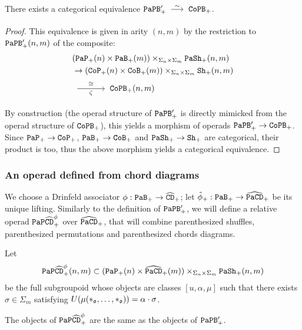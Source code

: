 \begin{proposition} \label{sw.prop.papb-prime}
  There exists a categorical equivalence $\PaPB_{+}' \qiso \CoPB_{+}$.
\end{proposition}
\begin{proof}
  This equivalence is given in arity $(n,m)$ by the restriction to $\mathtt{PaPB}'_{+}(n,m)$ of the composite:
  \begin{align*}
    & (\PaP_{+}(n) \times \PaB_{+}(m)) \times_{\Sigma_{n} \times
    \Sigma_{m}} \PaSh_{+}(n,m)
    \\
    & \to (\CoP_{+}(n) \times \CoB_{+}(m)) \times_{\Sigma_{n} \times \Sigma_{m}} \Sh_{+}(n,m)
    \\
    & \tkrightarrow[\zeta]{\cong} \CoPB_{+}(n,m)
  \end{align*}

  By construction (the operad structure of $\mathtt{PaPB}'_{+}$ is directly mimicked from the operad structure of $\mathtt{CoPB}_{+}$), this yields a morphism of operads $\mathtt{PaPB}'_{+} \to \mathtt{CoPB}_{+}$.
  Since $\mathtt{PaP}_{+} \to \mathtt{CoP}_{+}$, $\mathtt{PaB}_{+} \to \mathtt{CoB}_{+}$ and $\mathtt{PaSh}_{+} \to \mathtt{Sh}_{+}$ are categorical, their product is too, thus the above morphism yields a categorical equivalence.
\end{proof}

\subsubsection{An operad defined from chord diagrams}
\label{sw.sec.an-operad-defined}

We choose a Drinfeld associator $\phi : \mathtt{PaB}_{+} \to \widehat{\mathtt{CD}}_{+}$; let $\tilde\phi_{+} : \mathtt{PaB}_{+} \to \widehat{\mathtt{PaCD}}_{+}$ be its unique lifting.
Similarly to the definition of $\mathtt{PaPB}'_{+}$, we will define a relative operad $\mathtt{PaP}\widehat{\mathtt{CD}}_{+}^{\phi}$ over $\widehat{\mathtt{PaCD}}_{+}$, that will combine parenthesized shuffles, parenthesized permutations and parenthesized chords diagrams.

\begin{definition}
  Let
  \[ \mathtt{PaP}\widehat{\mathtt{CD}}_{+}^{\phi}(n,m) \subset (\mathtt{PaP}_{+}(n) \times \widehat{\mathtt{PaCD}}_{+}(m)) \times_{\Sigma_{n} \times \Sigma_{m}} \mathtt{PaSh}_{+}(n,m) \]
  be the full subgroupoid whose objects are classes $[u,\alpha,\mu]$ such that there exists $\sigma \in \Sigma_{m}$ satisfying $U(\mu(*_{\mathfrak{o}}, \dots, *_{\mathfrak{o}})) = \alpha \cdot \sigma$.
\end{definition}

\begin{remark}
  The objects of $\mathtt{PaP}\widehat{\mathtt{CD}}_{+}^{\phi}$ are the same as the objects of $\mathtt{PaPB}'_{+}$.
\end{remark}

